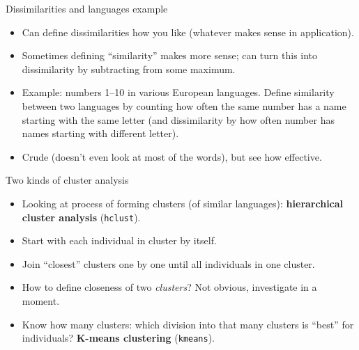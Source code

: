 \documentclass[ignorenonframetext,]{beamer}
\begin{document}
\begin{frame}{Dissimilarities and languages example}
\protect\hypertarget{dissimilarities-and-languages-example}{}

\begin{itemize}
\item
  Can define dissimilarities how you like (whatever makes sense in
  application).
\item
  Sometimes defining ``similarity'' makes more sense; can turn this into
  dissimilarity by subtracting from some maximum.
\item
  Example: numbers 1--10 in various European languages. Define
  similarity between two languages by counting how often the same number
  has a name starting with the same letter (and dissimilarity by how
  often number has names starting with different letter).
\item
  Crude (doesn't even look at most of the words), but see how effective.
\end{itemize}

\end{frame}

\begin{frame}[fragile]{Two kinds of cluster analysis}
\protect\hypertarget{two-kinds-of-cluster-analysis}{}

\begin{itemize}
\item
  Looking at process of forming clusters (of similar languages):
  \textbf{hierarchical cluster analysis} (\texttt{hclust}).
\item
  Start with each individual in cluster by itself.
\item
  Join ``closest'' clusters one by one until all individuals in one
  cluster.
\item
  How to define closeness of two \emph{clusters}? Not obvious,
  investigate in a moment.
\item
  Know how many clusters: which division into that many clusters is
  ``best'' for individuals? \textbf{K-means clustering}
  (\texttt{kmeans}).
\end{itemize}

\end{frame}
\end{document}
